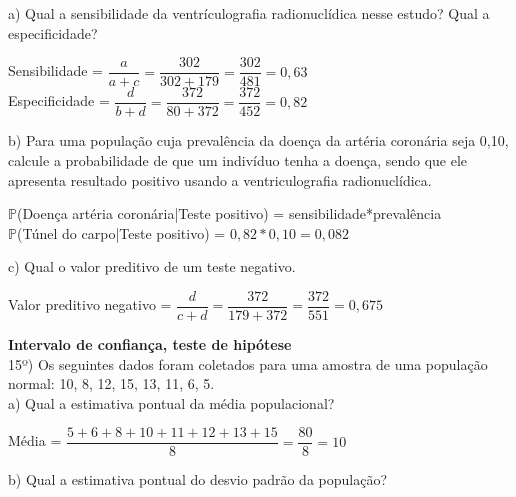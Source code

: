 \documentclass[12pt,a4paper]{article}
\begin{document}
	a) Qual a sensibilidade da ventrículografia radionuclídica nesse estudo? Qual a especificidade?\\
	\begin{center}
		Sensibilidade = $\dfrac{a}{a + c} = \dfrac{302}{302 + 179} = \dfrac{302}{481} = 0,63$
		\vspace{0.5cm}\\
		Especificidade = $\dfrac{d}{b + d} = \dfrac{372}{80 + 372} = \dfrac{372}{452} = 0,82$
	\end{center}
	b) Para uma população cuja prevalência da doença da artéria coronária seja 0,10,	calcule a probabilidade de que um indivíduo tenha a doença, sendo que ele apresenta resultado positivo usando a ventriculografia radionuclídica.\\
	\begin{center}
		$\mathbb{P}$(Doença artéria coronária|Teste positivo) = sensibilidade*prevalência\\
		\vspace{0,25cm}
		$\mathbb{P}$(Túnel do carpo|Teste positivo) = $0,82*0,10 = 0,082$
	\end{center}
	\vspace{1cm}
	c) Qual o valor preditivo de um teste negativo.
	\begin{center}
		Valor preditivo negativo = $\dfrac{d}{c + d} = \dfrac{372}{179 + 372} = \dfrac{372}{551} = 0,675$
	\end{center}
	\vspace{1cm}
	\textbf{Intervalo de confiança, teste de hipótese}\\
	15º) Os seguintes dados foram coletados para uma amostra de uma população normal: 10, 8, 12, 15, 13, 11, 6, 5.\\
	a) Qual a estimativa pontual da média populacional?\\
	\begin{center}
		Média = $\dfrac{5 + 6 + 8 + 10 + 11 + 12 + 13 + 15}{8} = \dfrac{80}{8} = 10$
	\end{center}
	\vspace{1cm}
	b) Qual a estimativa pontual do desvio padrão da população?\\
\end{document}
